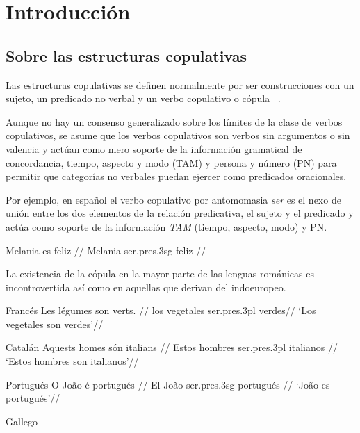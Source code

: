 \chapter{Introducción}
\vspace*{-.25in}
\section{Sobre las estructuras copulativas}
Las estructuras copulativas se definen normalmente por ser construcciones con un sujeto, un predicado no verbal y un verbo copulativo o cópula ~\autocite{Bentley20179Copular-and-}. 

Aunque no hay un consenso generalizado sobre los límites de la clase de verbos copulativos, se asume que los verbos copulativos son verbos sin argumentos o sin valencia y actúan como mero soporte de la información gramatical de concordancia, tiempo, aspecto y modo (TAM) y persona y número (PN) para permitir que categorías no verbales puedan ejercer como predicados oracionales. 

Por ejemplo, en español el verbo copulativo por antomomasia \textit{ser} es el nexo de unión entre los dos elementos de la relación predicativa, el sujeto y el predicado y actúa como soporte de la información \textit{TAM} (tiempo, aspecto, modo) y PN.

\ex[glspace=!1em,everygla={},everyglb={},aboveglbskip=-.2ex]
\begingl
\gla Melania es feliz //
\glb Melania ser.{\sc pres}.{\sc 3sg} feliz  //
\endgl
\xe



La existencia de la cópula en la mayor parte de las lenguas románicas es incontrovertida así como en aquellas que derivan del indoeuropeo. 

Francés
\ex[glspace=!1em,everygla={},everyglb=\footnotesize,aboveglbskip=-.2ex]
\begingl
\gla Les légumes son verts. //
\glb los vegetales ser.{\sc pres}.{\sc 3pl} verdes//
\glft ‘Los vegetales son verdes’//
\endgl
\xe


Catalán
\ex[glspace=!1em,everygla={},everyglb={},aboveglbskip=-.2ex]
\begingl
\gla Aquests homes són italians //
\glb Estos hombres ser.{\sc pres}.{\sc 3pl} italianos  //
\glft ‘Estos hombres son italianos’//
\endgl
\xe


Portugués
\ex[glspace=!1em,everygla={},everyglb={},aboveglbskip=-.2ex]
\begingl
\gla O João é portugués //
\glb El João ser.{\sc pres}.{\sc 3sg} portugués  //
\glft ‘João es portugués’//
\endgl
\xe

Gallego

